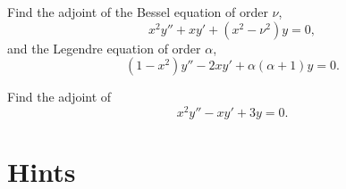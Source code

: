 {%
\begin{Exercise}
  \label{exercise adjoint x2yxyx2nu2y=0}
  Find the adjoint of the Bessel equation of order $\nu$,
  \[
  x^2 y'' + x y' + (x^2 - \nu^2) y = 0,
  \]
  and the Legendre equation of order $\alpha$,
  \[
  (1-x^2) y'' - 2 x y' + \alpha (\alpha+1) y = 0.
  \]

\end{Exercise}






\begin{Exercise}
  \label{exercise adjoint x2yxy3y=0}
  Find the adjoint of 
  \[ 
  x^2 y'' - x y' + 3 y = 0. 
  \]

\end{Exercise}























\raggedbottom
}
{
}
\pagebreak
\flushbottom
\section{Hints}




\begin{Hint}
  \label{hint second order exact}
\end{Hint}


\begin{Hint}
  \label{hint second order integrating factor}
\end{Hint}





\begin{Hint}
  \label{hint yxyy=0}
\end{Hint}




